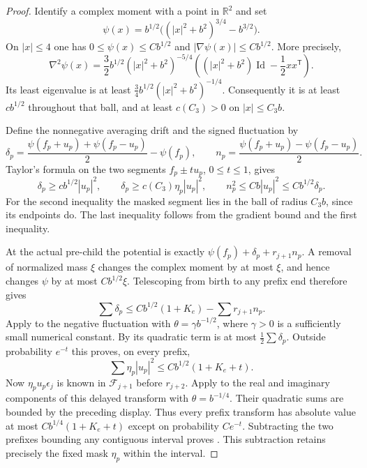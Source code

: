 \begin{proof}
Identify a complex moment with a point in $\mathbb R^2$ and set
\[
 \psi(x)=b^{1/2}\big((|x|^2+b^2)^{3/4}-b^{3/2}\big).
\]
On $|x|\le4$ one has $0\le\psi(x)\le Cb^{1/2}$ and
$|\nabla\psi(x)|\le Cb^{1/2}$.  More precisely,
\[
 \nabla^2\psi(x)
 =\frac32 b^{1/2}(|x|^2+b^2)^{-5/4}
       \left((|x|^2+b^2)\operatorname{Id}-\frac12 x x^{\mathsf T}\right).
\]
Its least eigenvalue is at least
$\frac34 b^{1/2}(|x|^2+b^2)^{-1/4}$.  Consequently it is at least
$c b^{1/2}$ throughout that ball, and at least $c(C_3)>0$ on
$|x|\le C_3b$.

Define the nonnegative averaging drift and the signed fluctuation by
\[
 \delta_p=\frac{\psi(f_p+u_p)+\psi(f_p-u_p)}2-\psi(f_p),\qquad
 n_p=\frac{\psi(f_p+u_p)-\psi(f_p-u_p)}2.
\]
Taylor's formula on the two segments $f_p\pm t u_p$, $0\le t\le1$, gives
\begin{equation}
 \delta_p\ge c b^{1/2}|u_p|^2,
 \qquad \delta_p\ge c(C_3)\eta_p|u_p|^2,
 \qquad n_p^2\le Cb|u_p|^2\le Cb^{1/2}\delta_p.
 \label{eq:paths-scalar-drift}
\end{equation}
For the second inequality the masked segment lies in the ball of radius
$C_3b$, since its endpoints do.  The last inequality follows from the
gradient bound and the first inequality.

At the actual pre-child the potential is exactly
$\psi(f_p)+\delta_p+r_{j+1}n_p$.  A removal of normalized mass $\xi$ changes
the complex moment by at most $\xi$, and hence changes $\psi$ by at most
$Cb^{1/2}\xi$.  Telescoping from birth to any prefix end therefore gives
\[
 \sum\delta_p\le Cb^{1/2}(1+K_e)-\sum r_{j+1}n_p.
\]
Apply  to the negative fluctuation with
$\theta=\gamma b^{-1/2}$, where $\gamma>0$ is a sufficiently small numerical
constant.  By  its quadratic term is at most
$\frac12\sum\delta_p$.  Outside probability $e^{-t}$ this proves, on every
prefix,
\[
 \sum\eta_p|u_p|^2\le Cb^{1/2}(1+K_e+t).
\]
Now $\eta_pu_p\epsilon_j$ is known in $\mathcal F_{j+1}$ before $r_{j+2}$.
Apply  to the real and imaginary components of this
delayed transform with $\theta=b^{-1/4}$.  Their quadratic sums are bounded
by the preceding display.  Thus every prefix transform has absolute value
at most $Cb^{1/4}(1+K_e+t)$ except on probability $Ce^{-t}$.  Subtracting
the two prefixes bounding any contiguous interval proves
.  This subtraction retains precisely the fixed mask
$\eta_p$ within the interval.
\end{proof}

